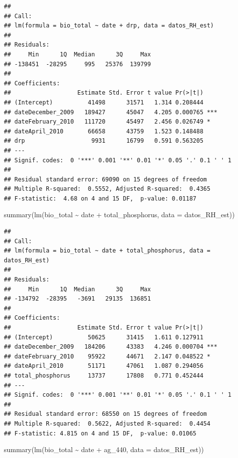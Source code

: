 \documentclass[
]{book}
\newenvironment{Shaded}{\begin{snugshade}}{\end{snugshade}}
\newcommand{\AttributeTok}[1]{\textcolor[rgb]{0.77,0.63,0.00}{#1}}
\newcommand{\FunctionTok}[1]{\textcolor[rgb]{0.00,0.00,0.00}{#1}}
\newcommand{\NormalTok}[1]{#1}
\newcommand{\SpecialCharTok}[1]{\textcolor[rgb]{0.00,0.00,0.00}{#1}}
\begin{document}
\begin{verbatim}
## 
## Call:
## lm(formula = bio_total ~ date + drp, data = datos_RH_est)
## 
## Residuals:
##     Min      1Q  Median      3Q     Max 
## -138451  -28295     995   25376  139799 
## 
## Coefficients:
##                   Estimate Std. Error t value Pr(>|t|)    
## (Intercept)          41498      31571   1.314 0.208444    
## dateDecember_2009   189427      45047   4.205 0.000765 ***
## dateFebruary_2010   111720      45497   2.456 0.026749 *  
## dateApril_2010       66658      43759   1.523 0.148488    
## drp                   9931      16799   0.591 0.563205    
## ---
## Signif. codes:  0 '***' 0.001 '**' 0.01 '*' 0.05 '.' 0.1 ' ' 1
## 
## Residual standard error: 69090 on 15 degrees of freedom
## Multiple R-squared:  0.5552, Adjusted R-squared:  0.4365 
## F-statistic:  4.68 on 4 and 15 DF,  p-value: 0.01187
\end{verbatim}

\begin{Shaded}
\begin{Highlighting}[]
\FunctionTok{summary}\NormalTok{(}\FunctionTok{lm}\NormalTok{(bio\_total }\SpecialCharTok{\textasciitilde{}}\NormalTok{ date }\SpecialCharTok{+}\NormalTok{ total\_phosphorus, }\AttributeTok{data =}\NormalTok{ datos\_RH\_est))}
\end{Highlighting}
\end{Shaded}

\begin{verbatim}
## 
## Call:
## lm(formula = bio_total ~ date + total_phosphorus, data = datos_RH_est)
## 
## Residuals:
##     Min      1Q  Median      3Q     Max 
## -134792  -28395   -3691   29135  136851 
## 
## Coefficients:
##                   Estimate Std. Error t value Pr(>|t|)    
## (Intercept)          50625      31415   1.611 0.127911    
## dateDecember_2009   184206      43383   4.246 0.000704 ***
## dateFebruary_2010    95922      44671   2.147 0.048522 *  
## dateApril_2010       51171      47061   1.087 0.294056    
## total_phosphorus     13737      17808   0.771 0.452444    
## ---
## Signif. codes:  0 '***' 0.001 '**' 0.01 '*' 0.05 '.' 0.1 ' ' 1
## 
## Residual standard error: 68550 on 15 degrees of freedom
## Multiple R-squared:  0.5622, Adjusted R-squared:  0.4454 
## F-statistic: 4.815 on 4 and 15 DF,  p-value: 0.01065
\end{verbatim}

\begin{Shaded}
\begin{Highlighting}[]
\FunctionTok{summary}\NormalTok{(}\FunctionTok{lm}\NormalTok{(bio\_total }\SpecialCharTok{\textasciitilde{}}\NormalTok{ date }\SpecialCharTok{+}\NormalTok{ ag\_440, }\AttributeTok{data =}\NormalTok{ datos\_RH\_est))}
\end{Highlighting}
\end{Shaded}
\end{document}
